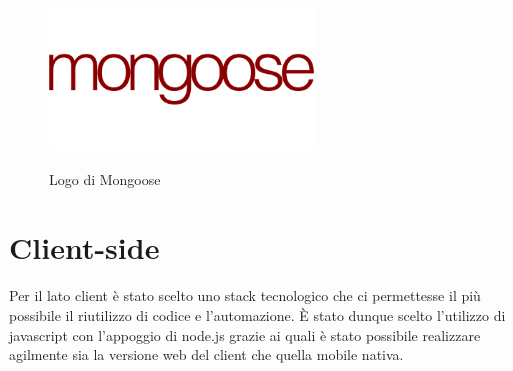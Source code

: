 \begin{figure}[H]
    \caption{Logo di Mongoose ~\cite{Mongoose21:online}}
    \centering
    \includegraphics[width=70mm]{img/logos/mongoose_logo.png}
    \label{fig:mongoose_logo}
\end{figure}



\section{Client-side}
Per il lato client è stato scelto uno stack tecnologico che ci permettesse il più possibile il riutilizzo di codice e l'automazione.\newline
È stato dunque scelto l'utilizzo di javascript con l'appoggio di node.js grazie ai quali è stato possibile realizzare agilmente sia la versione web del client che quella mobile nativa.\newline
\label{sub:client-tech}

